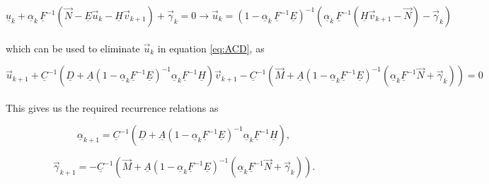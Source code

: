 \documentclass[11pt]{amsart}
\begin{document}
\begin{equation} \label{eq:IIb}
 \underline{u}_{k}  + \underline{\alpha}_{k} \, \underline{F}^{-1} \left( \vec{N}  - \underline{E} \vec{u}_{k} - \underline{H} \vec{v}_{k+1}  \right)  +  \vec{\gamma}_{k}  =  0      \longrightarrow       \vec{u}_{k}  =  \left(  1 - \underline{\alpha}_{k} \, \underline{F}^{-1} \underline{E}  \right)^{-1}     \left(   \underline{\alpha}_{k} \, \underline{F}^{-1}  \left(  \underline{H}  \vec{v}_{k+1} - \vec{N} \right) - \vec{\gamma}_{k}  \right)
\end{equation} 
\\
which can be used to eliminate $\vec{u}_{k}$ in equation \ref{eq:ACD}, as

\begin{equation} \label{eq:IIc}
\vec{u}_{k+1}  + \underline{C}^{-1} \left(  \underline{D}  + \underline{A} \left( 1 - \underline{\alpha}_{k} \underline{F}^{-1} \underline{E}  \right)^{-1} \underline{\alpha}_{k} \underline{F}^{-1} \underline{H}    \right) \vec{v}_{k+1}   -   \underline{C}^{-1} \left(  \vec{M}  +  \underline{A} \left( 1 - \underline{\alpha}_{k} \underline{F}^{-1} \underline{E}  \right)^{-1} \left(  \underline{\alpha}_{k} \underline{F}^{-1} \vec{N}  +  \vec{\gamma}_{k}   \right)  \right)   =  0
\end{equation} 
\\


This gives us the required recurrence relations as

\begin{equation} \label{eq:IIalpha}
\underline{\alpha}_{k+1}  =  \underline{C}^{-1} \left(  \underline{D}  + \underline{A} \left( 1 - \underline{\alpha}_{k} \underline{F}^{-1} \underline{E}  \right)^{-1} \underline{\alpha}_{k} \underline{F}^{-1} \underline{H}    \right) ,
\end{equation} 

\begin{equation} \label{eq:IIgamma}
\vec{\gamma}_{k+1}  =  -   \underline{C}^{-1} \left(  \vec{M}  +  \underline{A} \left( 1 - \underline{\alpha}_{k} \underline{F}^{-1} \underline{E}  \right)^{-1} \left(  \underline{\alpha}_{k} \underline{F}^{-1} \vec{N}  +  \vec{\gamma}_{k}   \right)  \right) .
\end{equation} 
\\
\end{document}
